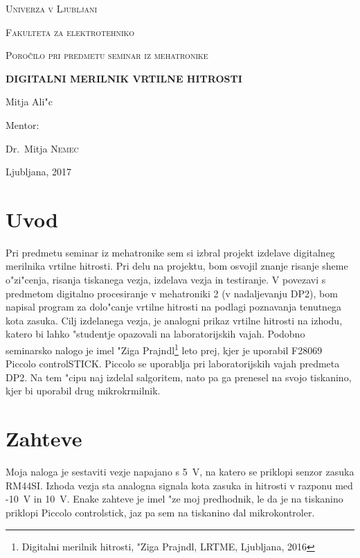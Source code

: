 \documentclass[a4paper]{article}
\begin{document}
\begin{titlepage}
	\centering

	{\scshape\LARGE Univerza v Ljubljani \par}
	{\scshape\large Fakulteta za elektrotehniko \par}
	\vspace{3cm}
	{\scshape\Large Poro\v cilo pri predmetu seminar iz mehatronike\par}
	\vspace{1.5cm}
	{\huge\bfseries DIGITALNI MERILNIK VRTILNE HITROSTI\par}
	\vspace{2cm}
	{\Large Mitja Ali"c\par}
	\vspace{0.5cm}
	Mentor:\par
	Dr.~Mitja  \textsc{Nemec}

	\vfill

	{\large Ljubljana, 2017\par}
\end{titlepage}


\tableofcontents

\newpage

\section{Uvod}
Pri predmetu seminar iz mehatronike sem si izbral projekt izdelave digitalneg merilnika vrtilne hitrosti. Pri delu na projektu, bom osvojil znanje risanje sheme o"zi"cenja, risanja tiskanega vezja, izdelava vezja in testiranje. V povezavi s predmetom digitalno procesiranje v mehatroniki 2 (v nadaljevanju DP2), bom napisal program za dolo"canje vrtilne hitrosti na podlagi poznavanja tenutnega kota zasuka. Cilj izdelanega vezja, je analogni prikaz vrtilne hitrosti na izhodu, katero bi lahko "studentje opazovali na laboratorijskih vajah. Podobno seminarsko nalogo je imel "Ziga Prajndl\footnote{Digitalni merilnik hitrosti, "Ziga Prajndl, LRTME, Ljubljana, 2016} leto prej, kjer je uporabil F28069 Piccolo controlSTICK. Piccolo se uporablja pri laboratorijskih vajah predmeta DP2. Na tem "cipu naj izdelal salgoritem, nato pa ga prenesel na svojo tiskanino, kjer bi uporabil drug mikrokrmilnik.

\section{Zahteve}

Moja naloga je sestaviti vezje napajano s 5~V, na katero se priklopi senzor zasuka RM44SI. Izhoda vezja sta analogna signala kota zasuka in hitrosti v razponu med -10~V in 10~V. Enake zahteve je imel "ze moj predhodnik, le da je na tiskanino priklopi Piccolo controlstick, jaz pa sem na tiskanino dal mikrokontroler.
\end{document}
